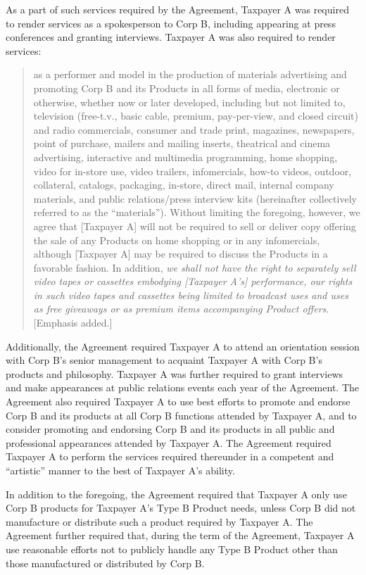 \begin{select}
As a part of such services required by the Agreement, Taxpayer A was
required to render services as a spokesperson to Corp B, including appearing at
press conferences and granting interviews. Taxpayer A was also required to render
services:
\begin{quotation}
as a performer and model in the production of materials advertising and
promoting Corp B and its Products in all forms of media, electronic or
otherwise, whether now or later developed, including but not limited to,
television (free-t.v.\@, basic cable, premium, pay-per-view, and closed circuit)
and radio commercials, consumer and trade print, magazines, newspapers,
point of purchase, mailers and mailing inserts, theatrical and cinema
advertising, interactive and multimedia programming, home shopping, video
for in-store use, video trailers, infomercials, how-to videos, outdoor,
collateral, catalogs, packaging, in-store, direct mail, internal company
materials, and public relations/press interview kits (hereinafter collectively
referred to as the ``materials''). Without limiting the foregoing, however, we
agree that [Taxpayer A] will not be required to sell or deliver copy offering the
sale of any Products on home shopping or in any infomercials, although
[Taxpayer A] may be required to discuss the Products in a favorable fashion. 
In addition, \emph{we shall not have the right to separately sell video tapes or
cassettes embodying [Taxpayer A's] performance, our rights in such video
tapes and cassettes being limited to broadcast uses and uses as free
giveaways or as premium items accompanying Product offers}. [Emphasis
added.]
\end{quotation}
Additionally, the Agreement required Taxpayer A to attend an orientation
session with Corp B's senior management to acquaint Taxpayer A with Corp B's
products and philosophy. Taxpayer A was further required to grant interviews and
make appearances at public relations events each year of the Agreement. The
Agreement also required Taxpayer A to use best efforts to promote and endorse
Corp B and its products at all Corp B functions attended by Taxpayer A, and to
consider promoting and endorsing Corp B and its products in all public and
professional appearances attended by Taxpayer A. The Agreement required
Taxpayer A to perform the services required thereunder in a competent and
``artistic'' manner to the best of Taxpayer A's ability. 

In addition to the foregoing, the Agreement required that Taxpayer A only
use Corp B products for Taxpayer A's Type B Product needs, unless Corp B did not
manufacture or distribute such a product required by Taxpayer A. The Agreement
further required that, during the term of the Agreement, Taxpayer A use reasonable 
efforts not to publicly handle any Type B Product other than those manufactured or
distributed by Corp B.


\end{select}
